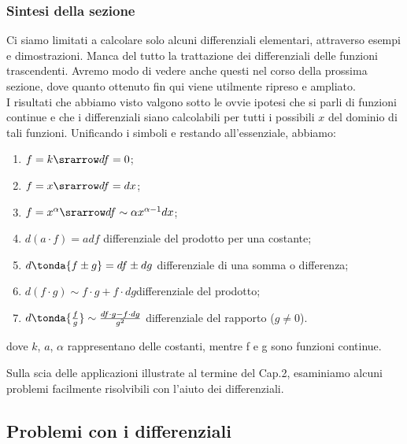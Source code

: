 \subsubsection{Sintesi della sezione}
\label{subsubsec:diff01_diffsint}
Ci siamo limitati a calcolare solo alcuni differenziali elementari, 
attraverso esempi 
e dimostrazioni. Manca del tutto la trattazione dei differenziali delle
funzioni trascendenti. Avremo modo di vedere anche questi nel corso della 
prossima
sezione, dove quanto ottenuto fin qui viene utilmente ripreso e ampliato.\\
I risultati che abbiamo visto valgono sotto le ovvie ipotesi
che si parli di funzioni continue e che i differenziali siano calcolabili
per tutti i possibili $x$ del dominio di tali funzioni. Unificando i simboli 
e restando
all'essenziale, abbiamo:
\begin{enumerate} [noitemsep]
 \item $f=k \srarrow df=0$;
 \item $f=x \srarrow df=dx$;
 \item $f=x^\alpha \srarrow df\sim\alpha x^{\alpha-1}dx$;\newline
 \item $d(a\cdot f)=adf$ \tab differenziale del prodotto per una costante;
 \item $d\tonda{f\pm g}=df\pm dg$ \tab differenziale di una somma o 
differenza;
 \item $d(f\cdot g)\sim f\cdot g+f\cdot dg$\tab differenziale del prodotto;
 \item $d\tonda{\frac{f}{g}}\sim\frac{df\cdot g-f\cdot dg}{g^2}$\tab  
differenziale 
 del rapporto (\(g \ne 0\)).
\end{enumerate}
dove  $k$, $a$, $\alpha$ rappresentano delle costanti, mentre f e g sono 
funzioni continue. 


Sulla scia delle applicazioni illustrate al termine del Cap.2, esaminiamo 
alcuni problemi 
facilmente risolvibili con l'aiuto dei differenziali.

\subsection{Problemi con i differenziali}
\label{subsec:diff01__problemi}

